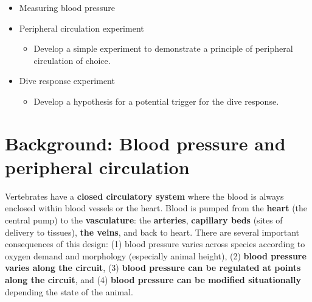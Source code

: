 \documentclass[
  letterpaper,
  DIV=11,
  numbers=noendperiod,
  oneside]{scrartcl}
\providecommand{\tightlist}{%
  \setlength{\itemsep}{0pt}\setlength{\parskip}{0pt}}\usepackage{longtable,booktabs,array}
\begin{document}
\begin{tcolorbox}[enhanced jigsaw, arc=.35mm, leftrule=.75mm, coltitle=black, left=2mm, rightrule=.15mm, colbacktitle=quarto-callout-note-color!10!white, opacitybacktitle=0.6, breakable, titlerule=0mm, colback=white, bottomrule=.15mm, toprule=.15mm, opacityback=0, colframe=quarto-callout-note-color-frame, toptitle=1mm, title=\textcolor{quarto-callout-note-color}{\faInfo}\hspace{0.5em}{Exercises}, bottomtitle=1mm]

\begin{itemize}
\tightlist
\item
  Measuring blood pressure
\item
  Peripheral circulation experiment

  \begin{itemize}
  \tightlist
  \item
    Develop a simple experiment to demonstrate a principle of peripheral
    circulation of choice.
  \end{itemize}
\item
  Dive response experiment

  \begin{itemize}
  \tightlist
  \item
    Develop a hypothesis for a potential trigger for the dive response.
  \end{itemize}
\end{itemize}

\end{tcolorbox}

\hypertarget{background-blood-pressure-and-peripheral-circulation}{%
\section{Background: Blood pressure and peripheral
circulation}\label{background-blood-pressure-and-peripheral-circulation}}

Vertebrates have a \textbf{closed circulatory system} where the blood is
always enclosed within blood vessels or the heart. Blood is pumped from
the \textbf{heart} (the central pump) to the \textbf{vasculature}: the
\textbf{arteries}, \textbf{capillary beds} (sites of delivery to
tissues), \textbf{the veins}, and back to heart. There are several
important consequences of this design: (1) blood pressure varies across
species according to oxygen demand and morphology (especially animal
height), (2) \textbf{blood pressure varies along the circuit}, (3)
\textbf{blood pressure can be regulated at points along the circuit},
and (4) \textbf{blood pressure can be modified situationally} depending
the state of the animal.
\end{document}
